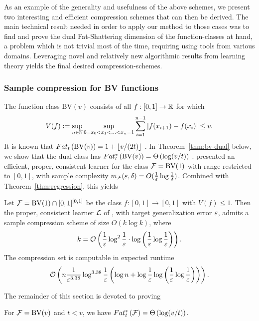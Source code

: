 \documentclass[12pt,a4paper,oneside,onecolumn]{book}
\begin{document}
As an example of the generality and usefulness of the above schemes, we present two interesting and efficient compression schemes that can then be derived. The main technical result needed in order to apply our method to those cases was to find and prove the dual Fat-Shattering dimension of the function-classes at hand, a problem which is not trivial most of the time, requiring using tools from various domains. Leveraging novel and relatively new algorithmic results from learning theory yields the final desired compression-schemes.
    



\subsubsection{Sample compression for BV functions}

\label{sec:BV}
\newcommand{\gammat}{t}
The function class $\mathrm{BV}(v)$ consists of all $f:[0,1]\to\mathbb{R}$ for which
\begin{eqnarray*}
V(f):=\sup_{n\in\mathbb{N}}\sup_{0=x_0<x_1<\ldots<x_n=1}\sum_{i=1}^{n-1}|f(x_{i+1})-f(x_i)| \le v.
\end{eqnarray*}
It is known
\citep[Theorem 11.12]{MR1741038} that 
$Fat_{t}\left(\mathrm{BV}(v)\right)=1+\left\lfloor v/(2t)\right\rfloor$
.
In Theorem~\ref{thm:bv-dual} below, we show that the dual class has
$Fat^*_{t}\left(\mathrm{BV}(v)\right)=\Theta\left(\log(v/t)\right)$
.
\citet{DBLP:journals/iandc/Long04} presented an efficient, proper, consistent learner
for the class $\mathcal{F}=\mathrm{BV}(1)$ with range restricted to $[0,1]$,
with sample complexity
$m_{\mathcal{F}}(\varepsilon,\delta)=O(\frac1{\varepsilon}\log\frac1\delta)$.
Combined with Theorem~\ref{thm:regression}, this yields
\begin{corollary}
  Let $\mathcal{F}=\mathrm{BV}(1)\cap[0,1]^{[0,1]}$
  be the class
  $f:[0,1] \to [0,1]$ with $V(f)\le1$.
  Then the proper, consistent learner $\mathcal{L}$
  of \citet{DBLP:journals/iandc/Long04},
  with target generalization error $\varepsilon$,
  admits
  a sample compression scheme of size $O(k\log k)$, where
  \[k = \mathcal{O}\left( \frac{1}{\varepsilon} \log^2 \frac{1}{\varepsilon} \cdot \log \left(\frac{1}{\varepsilon} \log \frac{1}{\varepsilon}\right)  \right).\]
The compression set is computable in expected runtime
  \[
    \mathcal{O}\left(  n \frac{1}{\varepsilon^{3.38}} \log^{3.38} \frac{1}{\varepsilon}
      \left(
        \log n + \log \frac{1}{\varepsilon} \log
        \left(
          \frac{1}{\varepsilon} \log \frac{1}{\varepsilon}
        \right)
        \right) \right)
    .
  \]
\end{corollary}

The remainder of this section is devoted to proving
\begin{theorem}
  \label{thm:bv-dual}
  For $\mathcal{F}=\mathrm{BV}(v)$
  and $t<v$,
  we have
  $Fat^*_{t}\left(\mathcal{F}\right)=\Theta\left(\log(v/t)\right)$.
\end{theorem}
\end{document}

